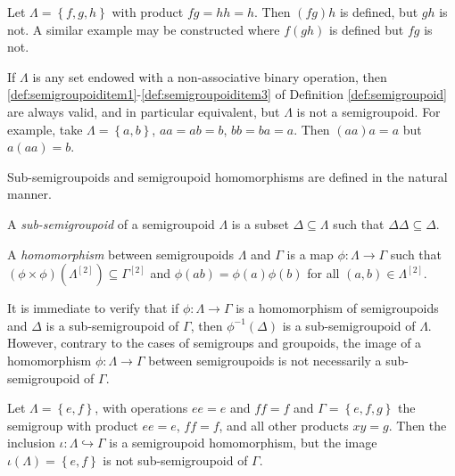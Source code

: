\begin{example}
Let $\Lambda=\left\{f,g,h\right\}$ with product $fg=hh=h$. Then $(fg)h$ is defined, but $gh$ is not. A similar example may be constructed where $f(gh)$ is defined but $fg$ is not.
\end{example}

\begin{example}
If $\Lambda$ is any set endowed with a non-associative binary operation, then \ref{def:semigroupoiditem1}-\ref{def:semigroupoiditem3} of Definition \ref{def:semigroupoid} are always valid, and in particular equivalent, but $\Lambda$ is not a semigroupoid. For example, take $\Lambda=\left\{a,b\right\}$, $aa=ab=b$, $bb=ba=a$. Then $(aa)a=a$ but $a(aa)=b$.
\end{example}

Sub-semigroupoids and semigroupoid homomorphisms are defined in the natural manner.

\begin{definition}
A \emph{sub-semigroupoid} of a semigroupoid $\Lambda$ is a subset $\Delta\subseteq\Lambda$ such that $\Delta\Delta\subseteq\Delta$.
\end{definition}

\begin{definition}
A \emph{homomorphism} between semigroupoids $\Lambda$ and $\Gamma$ is a map $\phi\colon\Lambda\to\Gamma$ such that $(\phi\times\phi)(\Lambda^{[2]})\subseteq\Gamma^{[2]}$ and $\phi(ab)=\phi(a)\phi(b)$ for all $(a,b)\in\Lambda^{[2]}$.
\end{definition}

It is immediate to verify that if $\phi\colon \Lambda\to\Gamma$ is a homomorphism of semigroupoids and $\Delta$ is a sub-semigroupoid of $\Gamma$, then $\phi^{-1}(\Delta)$ is a sub-semigroupoid of $\Lambda$. However, contrary to the cases of semigroups and groupoids, the image of a homomorphism $\phi\colon\Lambda\to\Gamma$ between semigroupoids is not necessarily a sub-semigroupoid of $\Gamma$.

\begin{example}\label{ex:imageofhomomorphismisnotasubsemigroupoid}
    Let $\Lambda=\left\{e,f\right\}$, with operations $ee=e$ and $ff=f$ and $\Gamma=\left\{e,f,g\right\}$ the semigroup with product $ee=e$, $ff=f$, and all other products $xy=g$. Then the inclusion $\iota\colon\Lambda\hookrightarrow\Gamma$ is a semigroupoid homomorphism, but the image $\iota(\Lambda)=\left\{e,f\right\}$ is not sub-semigroupoid of $\Gamma$.
\end{example}

